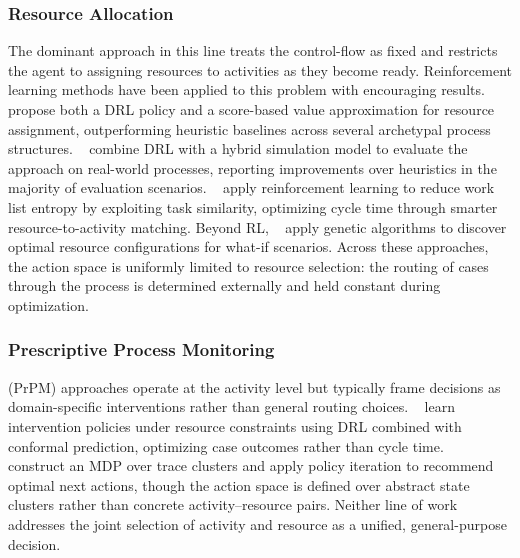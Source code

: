 \documentclass[runningheads]{llncs}
\begin{document}
\subsubsection{Resource Allocation}
\label{subsec:related_work_resource_allocation}
The dominant approach in this line treats the control-flow as fixed and restricts the agent to assigning resources to activities as they become ready. Reinforcement learning methods have been applied to this problem with encouraging results. \citeauthor{Learning_policies_drl}~\cite{Learning_policies_drl} propose both a DRL policy and a score-based value approximation for resource assignment, outperforming heuristic baselines across several archetypal process structures. \citeauthor{Optimizing_Resource_Allocation_Policies}~\cite{Optimizing_Resource_Allocation_Policies} combine DRL with a hybrid simulation model to evaluate the approach on real-world processes, reporting improvements over heuristics in the majority of evaluation scenarios. \citeauthor{Resource_allocation_using_task_similarity}~\cite{Resource_allocation_using_task_similarity} apply reinforcement learning to reduce work list entropy by exploiting task similarity, optimizing cycle time through smarter resource-to-activity matching. Beyond RL, \citeauthor{genetic_resource_allocations}~\cite{genetic_resource_allocations} apply genetic algorithms to discover optimal resource configurations for what-if scenarios. Across these approaches, the action space is uniformly limited to resource selection: the routing of cases through the process is determined externally and held constant during optimization.

\subsubsection{Prescriptive Process Monitoring}
(PrPM) approaches operate at the activity level but typically frame decisions as domain-specific interventions rather than general routing choices. \citeauthor{ppm_resource_constraints}~\cite{ppm_resource_constraints} learn intervention policies under resource constraints using DRL combined with conformal prediction, optimizing case outcomes rather than cycle time. \citeauthor{ppm_optimal_policy_temporal_data}~\cite{ppm_optimal_policy_temporal_data} construct an MDP over trace clusters and apply policy iteration to recommend optimal next actions, though the action space is defined over abstract state clusters rather than concrete activity--resource pairs. Neither line of work addresses the joint selection of activity and resource as a unified, general-purpose decision.
\end{document}
